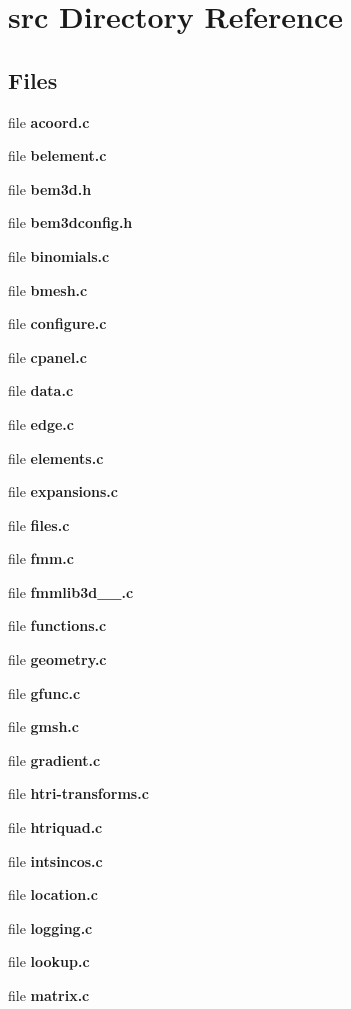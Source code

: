 \section{src Directory Reference}
\label{dir_68267d1309a1af8e8297ef4c3efbcdba}
\subsection*{Files}
\begin{DoxyCompactItemize}
\item 
file {\bfseries acoord.\+c}
\item 
file {\bfseries belement.\+c}
\item 
file {\bfseries bem3d.\+h}
\item 
file {\bfseries bem3dconfig.\+h}
\item 
file {\bfseries binomials.\+c}
\item 
file {\bfseries bmesh.\+c}
\item 
file {\bfseries configure.\+c}
\item 
file {\bfseries cpanel.\+c}
\item 
file {\bfseries data.\+c}
\item 
file {\bfseries edge.\+c}
\item 
file {\bfseries elements.\+c}
\item 
file {\bfseries expansions.\+c}
\item 
file {\bfseries files.\+c}
\item 
file {\bfseries fmm.\+c}
\item 
file {\bfseries fmmlib3d\+\_\+\_.\+c}
\item 
file {\bfseries functions.\+c}
\item 
file {\bfseries geometry.\+c}
\item 
file {\bfseries gfunc.\+c}
\item 
file {\bfseries gmsh.\+c}
\item 
file {\bfseries gradient.\+c}
\item 
file {\bfseries htri-\/transforms.\+c}
\item 
file {\bfseries htriquad.\+c}
\item 
file {\bfseries intsincos.\+c}
\item 
file {\bfseries location.\+c}
\item 
file {\bfseries logging.\+c}
\item 
file {\bfseries lookup.\+c}
\item 
file {\bfseries matrix.\+c}

\end{DoxyCompactItemize}

